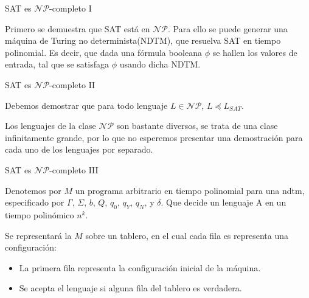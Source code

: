 \documentclass[10pt, mathserif, profesionalfont]{beamer}
\begin{document}
\begin{frame}{SAT es $\mathcal{NP}$-completo I}

  \begin{block}{}
    Primero se demuestra que SAT está en $\mathcal{NP}$. Para ello se puede generar
    una máquina de Turing no determinista(NDTM), que resuelva SAT en tiempo polinomial.
    Es decir, que dada una fórmula booleana $\phi$ se hallen los valores de entrada, tal
    que se satisfaga $\phi$ usando dicha NDTM.
  \end{block}

\end{frame}

\begin{frame}{SAT es $\mathcal{NP}$-completo II}

\begin{block}{}
  Debemos demostrar que para todo lenguaje $L\in \mathcal{NP}$,
  $L \preceq L_{SAT}$.
\end{block}

\begin{block}{}
  Los lenguajes de la clase $\mathcal{NP}$
  son bastante diversos, se trata de una clase infinitamente grande, por lo que
  no esperemos presentar una demostración para cada uno de los lenguajes por
  separado.
\end{block}

\end{frame}


\begin{frame}{SAT es $\mathcal{NP}$-completo III}

\begin{block}{}
  Denotemos por $M$ un programa arbitrario en tiempo polinomial
  para una \gls{ndtm}, especificado por $\Gamma$, $\Sigma$, $b$, $Q$, $q_0$,
  $q_Y$, $q_N$, y $\delta$. Que decide un lenguaje A en un tiempo polinómico
  $n^k$.
\end{block}

\begin{block}{}
  Se representará la $M$ sobre un tablero, en el cual cada fila es representa una configuración:
  \begin{itemize}
  	\item La primera fila representa la configuración inicial de la máquina.
    \item Se acepta el lenguaje si alguna fila del tablero es verdadera.
  \end{itemize}
\end{block}

\end{frame}
\end{document}
